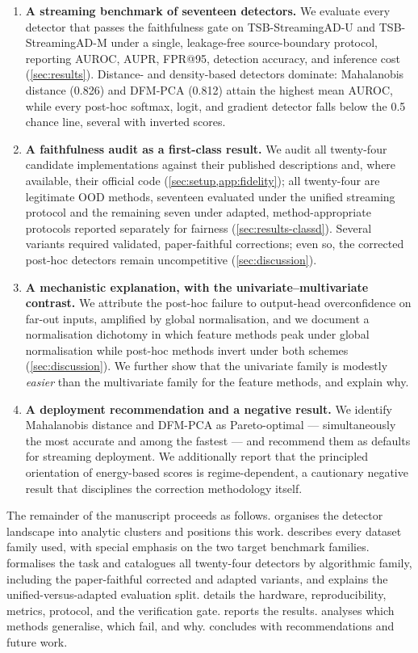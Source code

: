 \documentclass[11pt]{article}
\begin{document}
\begin{enumerate}
  \item \textbf{A streaming benchmark of seventeen detectors.} We evaluate every
  detector that passes the faithfulness gate on TSB-StreamingAD-U and
  TSB-StreamingAD-M under a single, leakage-free source-boundary protocol,
  reporting AUROC, AUPR, FPR@95, detection accuracy, and inference cost
  (\cref{sec:results}). Distance- and density-based detectors dominate: Mahalanobis
  distance (\num{0.826}) and DFM-PCA (\num{0.812}) attain the highest mean AUROC,
  while every post-hoc softmax, logit, and gradient detector falls below the
  \num{0.5} chance line, several with inverted scores.
  \item \textbf{A faithfulness audit as a first-class result.} We audit all
  twenty-four candidate implementations against their published descriptions and,
  where available, their official code (\cref{sec:setup,app:fidelity}); all
  twenty-four are legitimate OOD methods, seventeen evaluated under the unified
  streaming protocol and the remaining seven under adapted, method-appropriate
  protocols reported separately for fairness (\cref{sec:results-classd}). Several
  variants required validated, paper-faithful corrections; even so, the corrected
  post-hoc detectors remain uncompetitive (\cref{sec:discussion}).
  \item \textbf{A mechanistic explanation, with the univariate--multivariate
  contrast.} We attribute the post-hoc failure to output-head overconfidence on
  far-out inputs, amplified by global normalisation, and we document a
  normalisation dichotomy in which feature methods peak under global normalisation
  while post-hoc methods invert under both schemes (\cref{sec:discussion}). We
  further show that the univariate family is modestly \emph{easier} than the
  multivariate family for the feature methods, and explain why.
  \item \textbf{A deployment recommendation and a negative result.} We identify
  Mahalanobis distance and DFM-PCA as Pareto-optimal --- simultaneously the most
  accurate and among the fastest --- and recommend them as defaults for streaming
  deployment. We additionally report that the principled orientation of
  energy-based scores is regime-dependent, a cautionary negative result that
  disciplines the correction methodology itself.
\end{enumerate}

The remainder of the manuscript proceeds as follows.  organises
the detector landscape into analytic clusters and positions this work.
 describes every dataset family used, with special emphasis on
the two target benchmark families.  formalises the task and
catalogues all twenty-four detectors by algorithmic family, including the
paper-faithful corrected and adapted variants, and explains the unified-versus-adapted
evaluation split.
 details the hardware, reproducibility, metrics, protocol, and the
verification gate.  reports the results. 
analyses which methods generalise, which fail, and why. 
concludes with recommendations and future work.
\end{document}

